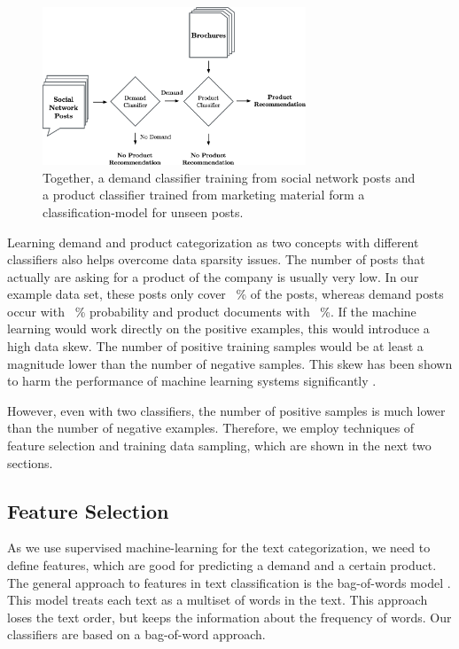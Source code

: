 \begin{figure}
	\label{fig:workflow}
	\begin{center}
		\includegraphics[width=0.7\textwidth]{figures/nto_workflow.eps}
	\end{center}
	\caption{Together, a demand classifier training from social network posts and a product classifier trained from marketing material form a classification-model for unseen posts.}
\end{figure}

Learning demand and product categorization as two concepts with different classifiers also helps overcome data sparsity issues.
The number of posts that actually are asking for a product of the company is usually very low.
In our example data set, these posts only cover ~\% of the posts, whereas demand posts occur with ~\% probability and product documents with ~\%.
If the machine learning would work directly on the positive examples, this would introduce a high data skew.
The number of positive training samples would be at least a magnitude lower than the number of negative samples.
This skew has been shown to harm the performance of machine learning systems significantly \cite{monard2002learning,guo2008class}.

However, even with two classifiers, the number of positive samples is much lower than the number of negative examples.
Therefore, we employ techniques of feature selection and training data sampling, which are shown in the next two sections.

\subsection{Feature Selection}
As we use supervised machine-learning for the text categorization, we need to define features, which are good for predicting a demand and a certain product.
The general approach to features in text classification is the bag-of-words model \cite{yang1997comparative,zhang2010understanding}.
This model treats each text as a multiset of words in the text.
This approach loses the text order, but keeps the information about the frequency of words.
Our classifiers are based on a bag-of-word approach.

